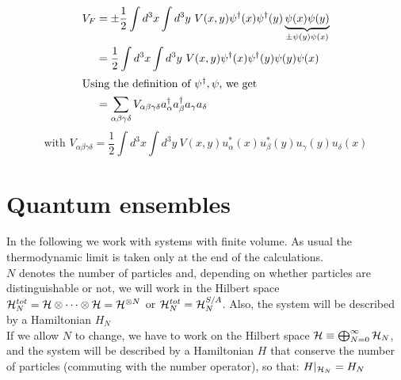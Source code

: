 \begin{enumerate}[label=\roman*)]
    \begin{align*}
        V_F &= \pm \frac 12 \int d^3x \int d^3y \ V(x,y) \psi^\dag(x) \psi^\dag(y) \underbrace{\psi(x)\psi(y)}_{\pm \psi(y)\psi(x)}\\
        &= \frac 12 \int d^3x \int d^3y \ V(x,y) \psi^\dag(x) \psi^\dag(y) \psi(y)\psi(x)\\
        \intertext{Using the definition of $\psi^\dag, \psi$, we get}
        &= \sum_{\alpha\beta\gamma\delta} V_{\alpha\beta\gamma\delta} a^\dag_\alpha a^\dag_\beta a_\gamma a_\delta
    \end{align*}
    $$ \text{with } V_{\alpha\beta\gamma\delta} = \frac 12\int d^3x\int d^3y \ V(x,y) u_\alpha^*(x) u_\beta^*(y) u_\gamma(y) u_\delta(x) $$
\end{enumerate}

\section{Quantum ensembles}
In the following we work with systems with finite volume. As usual the thermodynamic limit is taken only at the end of the calculations.\\
$N$ denotes the number of particles and, depending on whether particles are distinguishable or not, we will work in the Hilbert space $\mathcal{H}_N^{tot} = \mathcal{H} \otimes \dots \otimes \mathcal{H} = \mathcal{H}^{\otimes N}$ or $\mathcal{H}_N^{tot} = \mathcal{H}_N^{S/A}$. Also, the system will be described by a Hamiltonian $H_N$\\
If we allow $N$ to change, we have to work on the Hilbert space $\mathcal{H} \equiv \bigoplus_{N=0}^\infty \mathcal{H}_N$, and the system will be described by a Hamiltonian $H$ that conserve the number of particles (commuting with the number operator), so that: $H|_{\mathcal{H}_N} = H_N$

